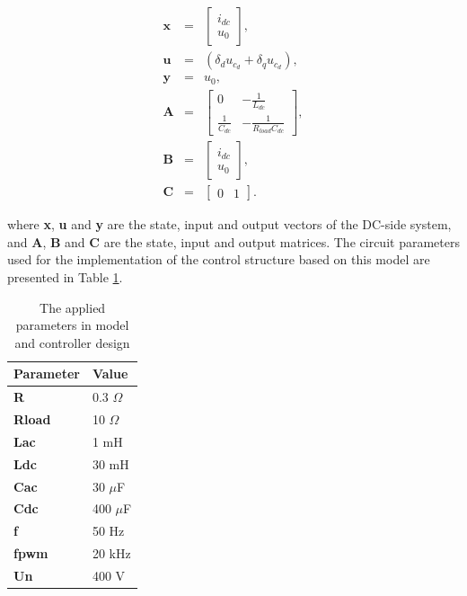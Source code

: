     \begin{equation}
        \begin{array}{rcl}
            \textbf{x}&=&\begin{bmatrix}
                i_{dc}\\
                u_0
            \end{bmatrix},\\
            \textbf{u}&=&(\delta_d u_{c_d}+\delta_q u_{c_d}),\\
            \textbf{y}&=&u_0,\\
            \textbf{A}&=&\begin{bmatrix}
                0&  -\frac{1}{L_{dc}}\\
                \frac{1}{C_{dc}}&   -\frac{1}{R_{load}C_{dc}}
            \end{bmatrix},\\
            \textbf{B}&=&\begin{bmatrix}
                i_{dc}\\
                u_0
            \end{bmatrix},\\
            \textbf{C}&=&\begin{bmatrix}0 &1\end{bmatrix}.
        \end{array}
        \label{EMPC:equ:mtx_ctrl}
    \end{equation}

    where \textbf{x}, \textbf{u} and \textbf{y} are the state, input and output vectors of the DC-side system, and \textbf{A}, \textbf{B} and \textbf{C} are the state, input and output matrices.
    The circuit parameters used for the implementation of the control structure based on this model are presented in Table \ref{EMPC:tbl:params}.

    \begin{table}[]
    \center
		\caption{The applied parameters in model and controller design}
        \begin{tabular}{|l|l|}
        \hline
        Parameter      & Value  \\ \hline
        \textbf{R}     & 0.3 $\Omega$ \\ \hline
        \textbf{Rload} & 10 $\Omega$  \\ \hline
        \textbf{Lac}   & 1 mH    \\ \hline
        \textbf{Ldc}   & 30 mH   \\ \hline
        \textbf{Cac}   & 30 $\mu$F   \\ \hline
        \textbf{Cdc}   & 400 $\mu$F  \\ \hline
        \textbf{f}     & 50 Hz   \\ \hline
        \textbf{fpwm}  & 20 kHz  \\ \hline
        \textbf{Un}    & 400 V   \\ \hline
        \end{tabular}
        \label{EMPC:tbl:params}
    \end{table}

